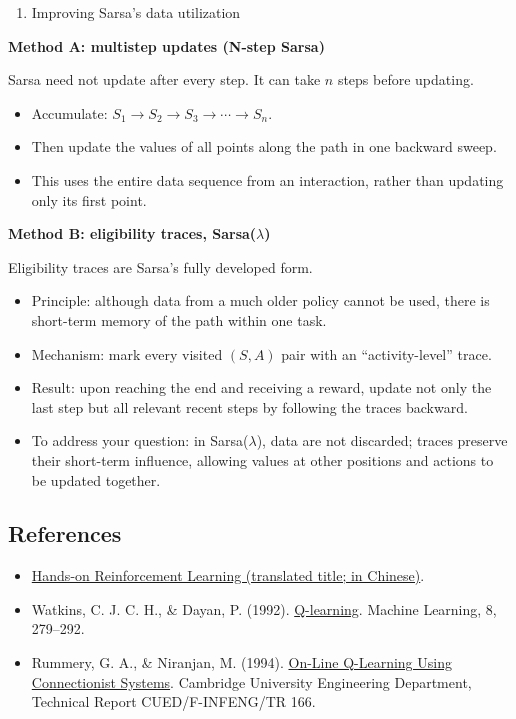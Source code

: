 \begin{enumerate}
\def\labelenumi{\arabic{enumi}.}
\setcounter{enumi}{4}
\tightlist
\item
  Improving Sarsa's data utilization
\end{enumerate}

\textbf{Method A: multistep updates (N-step Sarsa)}

Sarsa need not update after every step. It can take \(n\) steps before updating.

\begin{itemize}
\tightlist
\item
  Accumulate: \(S_1\to S_2\to S_3\to\cdots\to S_n\).
\item
  Then update the values of all points along the path in one backward sweep.
\item
  This uses the entire data sequence from an interaction, rather than updating only its first point.
\end{itemize}

\textbf{Method B: eligibility traces, Sarsa(\(\lambda\))}

Eligibility traces are Sarsa's fully developed form.

\begin{itemize}
\tightlist
\item
  Principle: although data from a much older policy cannot be used, there is short-term memory of the path within one task.
\item
  Mechanism: mark every visited \((S,A)\) pair with an ``activity-level'' trace.
\item
  Result: upon reaching the end and receiving a reward, update not only the last step but all relevant recent steps by following the traces backward.
\item
  To address your question: in Sarsa(\(\lambda\)), data are not discarded; traces preserve their short-term influence, allowing values at other positions and actions to be updated together.
\end{itemize}

\FloatBarrier
{}
\hypertarget{references-48}{%
\subsection{References}\label{references-48}}

\vspace{0.25em}
\begin{itemize}
\tightlist
\item
  \href{https://hrl.boyuai.com/}{Hands-on Reinforcement Learning (translated title; in Chinese)}.
\item
  Watkins, C. J. C. H., \& Dayan, P. (1992). \href{https://doi.org/10.1007/BF00992698}{Q-learning}. Machine Learning, 8, 279--292.
\item
  Rummery, G. A., \& Niranjan, M. (1994). \href{https://www.cs.utexas.edu/~shivaram/readings/b2hd-RummeryNiranjan1994.html}{On-Line Q-Learning Using Connectionist Systems}. Cambridge University Engineering Department, Technical Report CUED/F-INFENG/TR 166.
\end{itemize}

\clearpage
